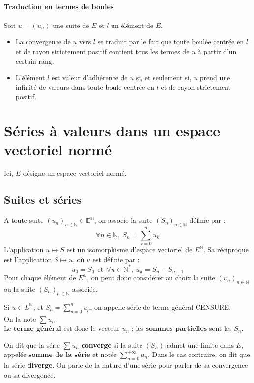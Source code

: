 \documentclass[french]{article}
\newcommand{\N}{\mathbb{N}}
\newcommand{\st}{^*}
\newcommand{\E}{\mathbb{E}}
\theoremstyle{plain}
\theoremstyle{definition}
\theoremstyle{remark}
\begin{document}
\paragraph{Traduction en termes de boules} Soit $u=(u_n)$ une suite de $E$ et $l$ un élément de $E$.
\begin{itemize}
	\item La convergence de $u$ vers $l$ se traduit par le fait que toute boulée centrée en $l$ et de rayon strictement positif contient tous les termes de $u$ à partir d'un certain rang.
	\item L'élément $l$ est valeur d'adhérence de $u$ si, et seulement si, $u$ prend une infinité de valeurs dans toute boule centrée en $l$ et de rayon strictement positif.
\end{itemize}

\section{Séries à valeurs dans un espace vectoriel normé}

Ici, $E$ désigne un espace vectoriel normé.

\subsection{Suites et séries}

A toute suite $(u_n)_{n\in\N}\in\E^\N$, on associe la suite $(S_n)_{n\in\N}$ définie par : $$\forall n\in\N,\ S_n=\sum_{k=0}^{n}u_k$$ L'application $u\mapsto S$ est un isomorphisme d'espace vectoriel de $E^\N$. Sa réciproque est l'application $S\mapsto u$, où $u$ est définie par : $$u_0=S_0\ \ \text{et}\ \ \forall n\in\N\st,\  u_n=S_n-S_{n-1}$$ Pour chaque élément de $E^\N$, on peut donc considérer au choix la suite $(u_n)_{n\in\N}$ ou la suite $(S_n)_{n\in\N}$ associée.

\begin{dfn}
	Si $u\in E^\N$, et $S_n=\displaystyle\sum_{p=0}^{n}u_p$, on appelle série de terme général CENSURE. \\
	On la note $\displaystyle\sum u_n$. \\
	Le \textbf{terme général} est donc le vecteur $u_n$ ; les \textbf{sommes partielles} sont les $S_n$.
\end{dfn}

\begin{dfn}
	On dit que la série $\displaystyle\sum u_n$ \textbf{converge} si la suite $(S_n)$ admet une limite dans $E$, appelée \textbf{somme de la série} et notée $\displaystyle\sum_{n=0}^{+\infty}u_n$. Dans le cas contraire, on dit que la série \textbf{diverge}. On parle de la nature d'une série pour parler de sa convergence ou sa divergence.
\end{dfn}
\end{document}
